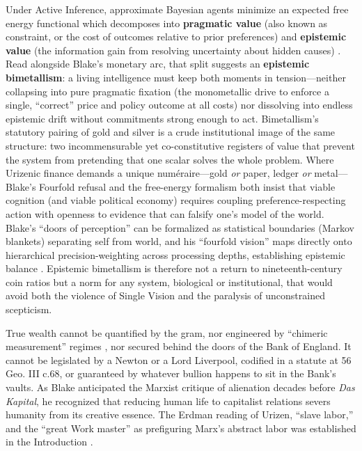 \documentclass[
]{article}
\begin{document}
Under Active Inference, approximate Bayesian agents minimize an expected
free energy functional which decomposes into \textbf{pragmatic value}
(also known as constraint, or the cost of outcomes relative to prior
preferences) and \textbf{epistemic value} (the information gain from
resolving uncertainty about hidden causes)
\citep{friston2010free, parr2018anatomy}. Read alongside Blake's
monetary arc, that split suggests an \textbf{epistemic bimetallism}: a
living intelligence must keep both moments in tension---neither
collapsing into pure pragmatic fixation (the monometallic drive to
enforce a single, ``correct'' price and policy outcome at all costs) nor
dissolving into endless epistemic drift without commitments strong
enough to act. Bimetallism's statutory pairing of gold and silver is a
crude institutional image of the same structure: two incommensurable yet
co-constitutive registers of value that prevent the system from
pretending that one scalar solves the whole problem. Where Urizenic
finance demands a unique numéraire---gold \emph{or} paper, ledger
\emph{or} metal---Blake's Fourfold refusal and the free-energy formalism
both insist that viable cognition (and viable political economy)
requires coupling preference-respecting action with openness to evidence
that can falsify one's model of the world. Blake's ``doors of
perception'' can be formalized as statistical boundaries (Markov
blankets) separating self from world, and his ``fourfold vision'' maps
directly onto hierarchical precision-weighting across processing depths,
establishing epistemic balance
\citep{friedman2026blake, friedman2026doors}. Epistemic bimetallism is
therefore not a return to nineteenth-century coin ratios but a norm for
any system, biological or institutional, that would avoid both the
violence of Single Vision and the paralysis of unconstrained scepticism.

True wealth cannot be quantified by the gram, nor engineered by
``chimeric measurement'' regimes \citep{albernaz2024common}, nor secured
behind the doors of the Bank of England. It cannot be legislated by a
Newton or a Lord Liverpool, codified in a statute at 56 Geo. III c.68,
or guaranteed by whatever bullion happens to sit in the Bank's vaults.
As Blake anticipated the Marxist critique of alienation decades before
\emph{Das Kapital}, he recognized that reducing human life to capitalist
relations severs humanity from its creative essence. The Erdman reading
of Urizen, ``slave labor,'' and the ``great Work master'' as prefiguring
Marx's abstract labor was established in the Introduction
\citep{erdman1954prophet}.
\end{document}
